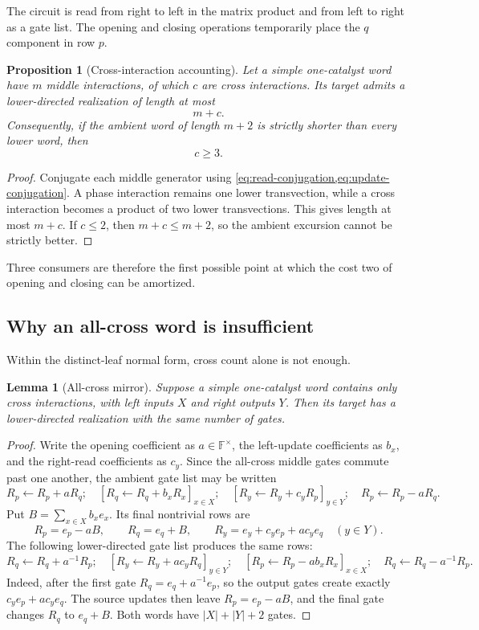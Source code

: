 \documentclass[11pt]{amsart}
\numberwithin{equation}{section}
\newtheorem{proposition}[theorem]{Proposition}
\newtheorem{lemma}[theorem]{Lemma}
\theoremstyle{definition}
\theoremstyle{remark}
\newcommand{\F}{\mathbb F}
\begin{document}
The circuit is read from right to left in the matrix product and from left to right as a gate list.  The opening and closing operations temporarily place the $q$ component in row $p$.

\begin{proposition}[Cross-interaction accounting]\label{prop:cross-accounting}
Let a simple one-catalyst word have $m$ middle interactions, of which $c$ are cross interactions.  Its target admits a lower-directed realization of length at most
\[
m+c.
\]
Consequently, if the ambient word of length $m+2$ is strictly shorter than every lower word, then
\[
c\ge3.
\]
\end{proposition}

\begin{proof}
Conjugate each middle generator using \cref{eq:read-conjugation,eq:update-conjugation}.  A phase interaction remains one lower transvection, while a cross interaction becomes a product of two lower transvections.  This gives length at most $m+c$.  If $c\le2$, then $m+c\le m+2$, so the ambient excursion cannot be strictly better.
\end{proof}

Three consumers are therefore the first possible point at which the cost two of opening and closing can be amortized.

\subsection{Why an all-cross word is insufficient}

Within the distinct-leaf normal form, cross count alone is not enough.

\begin{lemma}[All-cross mirror]\label{lem:all-cross-mirror}
Suppose a simple one-catalyst word contains only cross interactions, with left inputs $X$ and right outputs $Y$.  Then its target has a lower-directed realization with the same number of gates.
\end{lemma}

\begin{proof}
Write the opening coefficient as $a\in\F^\times$, the left-update coefficients as $b_x$, and the right-read coefficients as $c_y$.  Since the all-cross middle gates commute past one another, the ambient gate list may be written
\[
R_p\leftarrow R_p+aR_q;
\quad
[R_q\leftarrow R_q+b_xR_x]_{x\in X};
\quad
[R_y\leftarrow R_y+c_yR_p]_{y\in Y};
\quad
R_p\leftarrow R_p-aR_q.
\]
Put $B=\sum_{x\in X}b_xe_x$.  Its final nontrivial rows are
\[
R_p=e_p-aB,
\qquad
R_q=e_q+B,
\qquad
R_y=e_y+c_ye_p+ac_ye_q
\quad(y\in Y).
\]
The following lower-directed gate list produces the same rows:
\[
R_q\leftarrow R_q+a^{-1}R_p;
\quad
[R_y\leftarrow R_y+ac_yR_q]_{y\in Y};
\quad
[R_p\leftarrow R_p-ab_xR_x]_{x\in X};
\quad
R_q\leftarrow R_q-a^{-1}R_p.
\]
Indeed, after the first gate $R_q=e_q+a^{-1}e_p$, so the output gates create exactly $c_ye_p+ac_ye_q$.  The source updates then leave $R_p=e_p-aB$, and the final gate changes $R_q$ to $e_q+B$.  Both words have $|X|+|Y|+2$ gates.
\end{proof}
\end{document}
